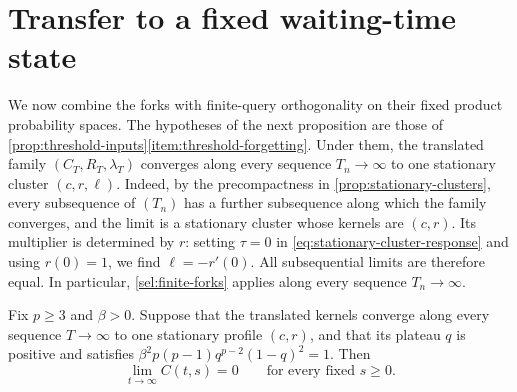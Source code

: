\section{Transfer to a fixed waiting-time state}\label{sec:general-transfer}

We now combine the forks with finite-query orthogonality on their fixed
product probability spaces. The hypotheses of the next proposition are those of
\cref{prop:threshold-inputs}\ref{item:threshold-forgetting}. Under them,
the translated family $(C_T,R_T,\lambda_T)$ converges along every sequence
$T_n\to\infty$ to one stationary cluster $(c,r,\ell)$. Indeed, by the
precompactness in \cref{prop:stationary-clusters}, every subsequence of
$(T_n)$ has a further subsequence along which the family converges, and the
limit is a stationary cluster whose kernels are $(c,r)$. Its multiplier is
determined by $r$: setting $\tau=0$ in \eqref{eq:stationary-cluster-response}
and using $r(0)=1$, we find $\ell=-r'(0)$. All subsequential limits are
therefore equal. In particular, \cref{sel:finite-forks} applies along every
sequence $T_n\to\infty$.

\begin{proposition}
\label{sel:general-fixed-wait}
Fix $p\ge3$ and $\beta>0$. Suppose that the translated kernels converge
along every sequence $T\to\infty$ to one stationary profile $(c,r)$, and
that its plateau $q$ is positive and satisfies
$\beta^2p(p-1)q^{p-2}(1-q)^2=1$. Then
\[
 \lim_{t\to\infty}C(t,s)=0\qquad\text{for every fixed }s\ge0.
\]
\end{proposition}

